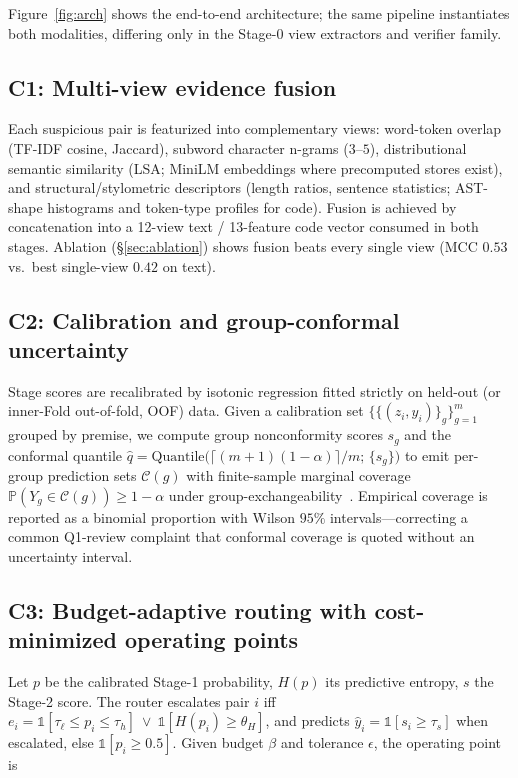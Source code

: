 \documentclass[conference]{IEEEtran}
\newcommand{\mcc}{\mathrm{MCC}}
\begin{document}
Figure~\ref{fig:arch} shows the end-to-end architecture; the same pipeline instantiates both
modalities, differing only in the Stage-0 view extractors and verifier family.

\subsection{C1: Multi-view evidence fusion}
Each suspicious pair is featurized into complementary views: word-token overlap (TF-IDF cosine,
Jaccard), subword character n-grams ($3$--$5$), distributional semantic similarity (LSA;
MiniLM embeddings where precomputed stores exist), and structural/stylometric descriptors (length
ratios, sentence statistics; AST-shape histograms and token-type profiles for code). Fusion is
achieved by concatenation into a 12-view text / 13-feature code vector consumed in both stages.
Ablation (\S\ref{sec:ablation}) shows fusion beats every single view ($\mcc$ $0.53$ vs.\ best
single-view $0.42$ on text).

\subsection{C2: Calibration and group-conformal uncertainty}
Stage scores are recalibrated by isotonic regression fitted strictly on held-out (or inner-Fold
out-of-fold, OOF) data. Given a calibration set $\{\{(z_i,y_i)\}_g\}_{g=1}^{m}$ grouped by premise,
we compute group nonconformity scores $s_g$ and the conformal quantile
$\hat{q} = \mathrm{Quantile}\!\big(\lceil (m{+}1)(1{-}\alpha)\rceil/m;\, \{s_g\}\big)$
to emit per-group prediction sets $\mathcal{C}(g)$ with finite-sample marginal coverage
$\mathbb{P}(Y_{g}\in\mathcal{C}(g))\ge 1-\alpha$ under group-exchangeability~\cite{vovk2005}.
Empirical coverage is reported as a binomial proportion with Wilson $95\%$ intervals---correcting a
common Q1-review complaint that conformal coverage is quoted without an uncertainty interval.

\subsection{C3: Budget-adaptive routing with cost-minimized operating points}
Let $p$ be the calibrated Stage-1 probability, $H(p)$ its predictive entropy, $s$ the Stage-2 score.
The router escalates pair $i$ iff
$e_i = \mathbb{1}[\tau_\ell \le p_i \le \tau_h]\ \lor\ \mathbb{1}[H(p_i)\ge\theta_H]$,
and predicts $\hat{y}_i = \mathbb{1}[s_i \ge \tau_s]$ when escalated, else
$\mathbb{1}[p_i \ge 0.5]$. Given budget $\beta$ and tolerance $\epsilon$, the operating point is
\end{document}
